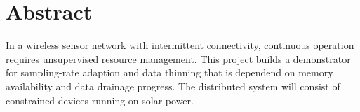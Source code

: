 \chapter{Abstract}
In a wireless sensor network with intermittent connectivity, continuous operation requires unsupervised resource management. This project builds a demonstrator for sampling-rate adaption and data thinning that is dependend on memory availability and data drainage progress. The distributed system will consist of constrained devices running on solar power.